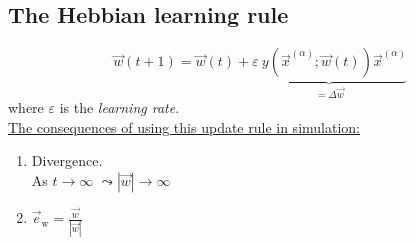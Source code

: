 \subsection{The Hebbian learning rule}

\begin{frame}{\subsecname}
\begin{equation}
\vec w(t+1) = \vec w(t) + \underbrace{\varepsilon~y(\vec x^ {(\alpha)}; \vec w(t)) \vec x^{(\alpha)}}_{= \Delta \vec w}
\end{equation}
where $\varepsilon$ is the \emph{learning rate}.\\

\underline{The consequences of using this update rule in simulation:}\\

\begin{enumerate}
\item Divergence.\\
As $t \rightarrow \infty$ \qquad $\leadsto |\vec{w}| \rightarrow \infty$\\

\pause 



\pause

\item $\vec{e}_{\mathrm{w}} = \frac{\vec{w}}{|\vec{w}|}$ 
\end{enumerate}

\end{frame}

